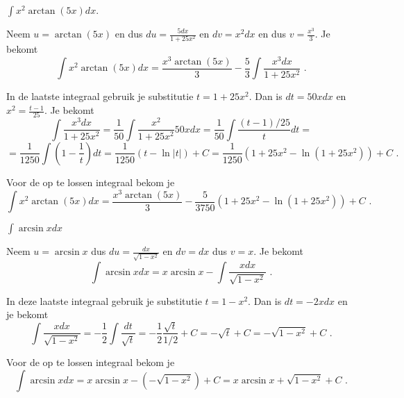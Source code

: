 \begin{voorbeeld}
	
$\int x^2 \arctan(5x)dx$.

Neem $u=\arctan (5x)$ en dus $du=\frac{5dx}{1+25x^2}$ en $dv=x^2dx$ en dus $v=\frac{x^3}{3}$.
Je bekomt
\[
\int x^2 \arctan(5x)dx=\frac{x^3 \arctan (5x)}{3}-\frac{5}{3} \int \frac {x^3dx}{1+25x^2} \text { .}
\]

In de laatste integraal gebruik je substitutie $t=1+25x^2$.
Dan is $dt=50xdx$ en $x^2=\frac{t-1}{25}$.
Je bekomt
\[
\int \frac {x^3dx}{1+25x^2}=\frac{1}{50}\int \frac{x^2}{1+25x^2}50xdx=\frac{1}{50}\int \frac{(t-1)/25}{t}dt=
\]
\[
=\frac{1}{1250}\int \left( 1-\frac{1}{t}  \right)dt=\frac{1}{1250}\left(  t-\ln \vert t \vert  \right)+C=\frac{1}{1250} \left( 1+25x^2-\ln \left( 1+25x^2 \right) \right)+C \text { .}
\]

Voor de op te lossen integraal bekom je
\[
\int x^2 \arctan(5x)dx=\frac{x^3 \arctan (5x)}{3}-\frac{5}{3750} \left( 1+25x^2-\ln \left( 1+25x^2 \right) \right)+C \text { .}
\]

\end{voorbeeld}

\begin{voorbeeld}
	$\int \arcsin x dx$

Neem $u=\arcsin x$ dus $du=\frac{dx}{\sqrt {1-x^2}}$ en $dv=dx$ dus $v=x$.
Je bekomt
\[
\int \arcsin x dx=x \arcsin x-\int \frac{xdx}{\sqrt{1-x^2}} \text { .}
\]

In deze laatste integraal gebruik je substitutie $t=1-x^2$.
Dan is $dt=-2xdx$ en je bekomt
\[
\int \frac{xdx}{\sqrt{1-x^2}}=-\frac{1}{2}\int \frac{dt}{\sqrt{t}}=-\frac{1}{2}\frac{\sqrt{t}}{1/2}+C=-\sqrt{t}+C=-\sqrt{1-x^2}+C \text { .}
\]

Voor de op te lossen integraal bekom je
\[
\int \arcsin x dx=x \arcsin x-\left( -\sqrt{1-x^2}  \right)+C=x \arcsin x+\sqrt{1-x^2} +C \text { .}
\]

\end{voorbeeld}


